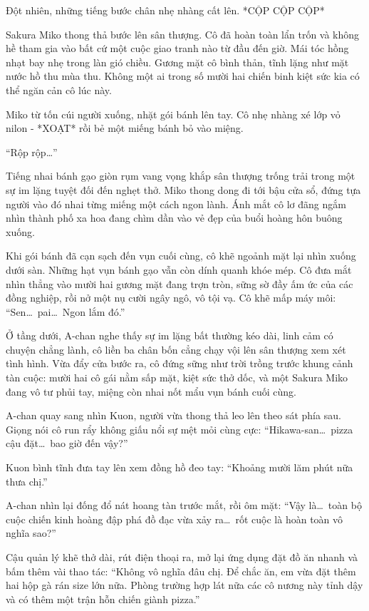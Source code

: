 \documentclass[../main.tex]{subfiles}
\begin{document}
Đột nhiên, những tiếng bước chân nhẹ nhàng cất lên. *CỘP CỘP CỘP*

Sakura Miko thong thả bước lên sân thượng. Cô đã hoàn toàn lẩn trốn và không hề tham gia vào bất cứ một cuộc giao tranh nào từ đầu đến giờ. Mái tóc hồng nhạt bay nhẹ trong làn gió chiều. Gương mặt cô bình thản, tĩnh lặng như mặt nước hồ thu mùa thu. Không một ai trong số mười hai chiến binh kiệt sức kia có thể ngăn cản cô lúc này.

Miko từ tốn cúi người xuống, nhặt gói bánh lên tay. Cô nhẹ nhàng xé lớp vỏ nilon - *XOẠT* rồi bẻ một miếng bánh bỏ vào miệng.

``Rộp rộp\dots''

Tiếng nhai bánh gạo giòn rụm vang vọng khắp sân thượng trống trải trong một sự im lặng tuyệt đối đến nghẹt thở. Miko thong dong đi tới bậu cửa sổ, đứng tựa người vào đó nhai từng miếng một cách ngon lành. Ánh mắt cô lơ đãng ngắm nhìn thành phố xa hoa đang chìm dần vào vẻ đẹp của buổi hoàng hôn buông xuống.

Khi gói bánh đã cạn sạch đến vụn cuối cùng, cô khẽ ngoảnh mặt lại nhìn xuống dưới sàn. Những hạt vụn bánh gạo vẫn còn dính quanh khóe mép. Cô đưa mắt nhìn thẳng vào mười hai gương mặt đang trợn tròn, sững sờ đầy ấm ức của các đồng nghiệp, rồi nở một nụ cười ngây ngô, vô tội vạ. Cô khẽ mấp máy môi:
``Sen\dots\ pai\dots\ Ngon lắm đó.''

Ở tầng dưới, A-chan nghe thấy sự im lặng bất thường kéo dài, linh cảm có chuyện chẳng lành, cô liền ba chân bốn cẳng chạy vội lên sân thượng xem xét tình hình. Vừa đẩy cửa bước ra, cô đứng sững như trời trồng trước khung cảnh tàn cuộc: mười hai cô gái nằm sấp mặt, kiệt sức thở dốc, và một Sakura Miko đang vô tư phủi tay, miệng còn nhai nốt mẩu vụn bánh cuối cùng.

A-chan quay sang nhìn Kuon, người vừa thong thả leo lên theo sát phía sau. Giọng nói cô run rẩy không giấu nổi sự mệt mỏi cùng cực:
``Hikawa-san\dots\ pizza cậu đặt\dots\ bao giờ đến vậy?''

Kuon bình tĩnh đưa tay lên xem đồng hồ đeo tay:
``Khoảng mười lăm phút nữa thưa chị.''

A-chan nhìn lại đống đổ nát hoang tàn trước mắt, rồi ôm mặt:
``Vậy là\dots\ toàn bộ cuộc chiến kinh hoàng đập phá đồ đạc vừa xảy ra\dots\ rốt cuộc là hoàn toàn vô nghĩa sao?''

Cậu quản lý khẽ thở dài, rút điện thoại ra, mở lại ứng dụng đặt đồ ăn nhanh và bấm thêm vài thao tác:
``Không vô nghĩa đâu chị. Để chắc ăn, em vừa đặt thêm hai hộp gà rán size lớn nữa. Phòng trường hợp lát nữa các cô nương này tỉnh dậy và có thêm một trận hỗn chiến giành pizza.''
\end{document}
